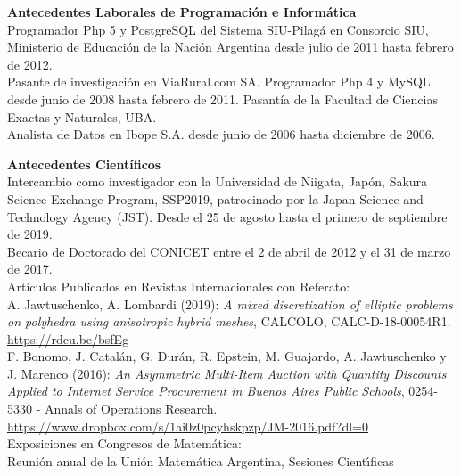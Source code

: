 \textbf{Antecedentes Laborales de Programaci\'on e Inform\'atica}\\[6pt]
Programador Php 5 y PostgreSQL del Sistema SIU-Pilag\'a en Consorcio SIU, Ministerio de Educaci\'on de la Naci\'on Argentina desde julio de 2011 hasta febrero de 2012.\\[4pt]
Pasante de investigaci\'on en ViaRural.com SA. Programador
Php 4 y MySQL desde junio de 2008 
hasta febrero de 2011. Pasant\'ia de la Facultad de Ciencias Exactas y Naturales, UBA.\\[4pt]
Analista de Datos en Ibope S.A. desde junio de 2006 hasta diciembre de 2006.

\textbf{Antecedentes Cient\'ificos}\\[6pt]
Intercambio como investigador con la Universidad de Niigata, Jap\'on,
Sakura Science Exchange Program, SSP2019, patrocinado por
la Japan Science and Technology Agency (JST). Desde el 25 de agosto
hasta el primero de septiembre de 2019.\\[6pt]
Becario de Doctorado del CONICET entre el 2 de abril de 2012 y el 31 de marzo de 2017.\\[6pt]
Art\'iculos Publicados en Revistas Internacionales con Referato:\\[6pt]
A. Jawtuschenko, A. Lombardi (2019): 
\emph{A mixed discretization of elliptic problems on polyhedra using anisotropic hybrid meshes},
CALCOLO, CALC-D-18-00054R1.
\href{http://em.rdcu.be/wf/click?upn=lMZy1lernSJ7apc5DgYM8RtiRnX98cgbvE81KQGn5tE-3D_-2Fq09Vpjrycd-2BAOhvYDidHaHWLaG8WMoWs1lRs2mKTzqCwYNFhlGtplH8kb8yUCOrEFESCWAEP1qrD-2BJgg09nu-2Fz61XDXWYdppeXx4JzFRLvI-2FYyjZMrov-2FaxFxLv9MaqfC-2BjYanB-2FkLIArphbTB7hvuq-2BJ-2BP0dpoVrgh2NJYizQcMbyo6AA8jcx6RYsWvb3RMk9c7QXTqmoLaHKr8Xg6yK2lC1IxrYwuPPxXUxfxXQc0WAqTO-2Bg-2F9P-2BWkhJXyogoqkg5GNjl1KqQhJV5xi014g-3D-3D}{\color{blue}https://rdcu.be/bsfEg}
\\[4pt]
F. Bonomo, J. Catal\'an, G. Dur\'an, R. Epstein, M. Guajardo, A. Jawtuschenko y J. Marenco (2016):
\emph{An Asymmetric Multi-Item Auction with Quantity Discounts Applied to Internet 
Service Procurement in Buenos Aires Public Schools}, 
0254-5330 - Annals of Operations Research.\\
\href{https://www.dropbox.com/s/1ai0z0pcyhskpzp/JM-2016.pdf?dl=0}{\color{blue}https://www.dropbox.com/s/1ai0z0pcyhskpzp/JM-2016.pdf?dl=0}\\[6pt]
Exposiciones en Congresos de Matem\'atica:\\[6pt]
Reuni\'on anual de la Uni\'on Matem\'atica Argentina, Sesiones Cient\'{\i}ficas
